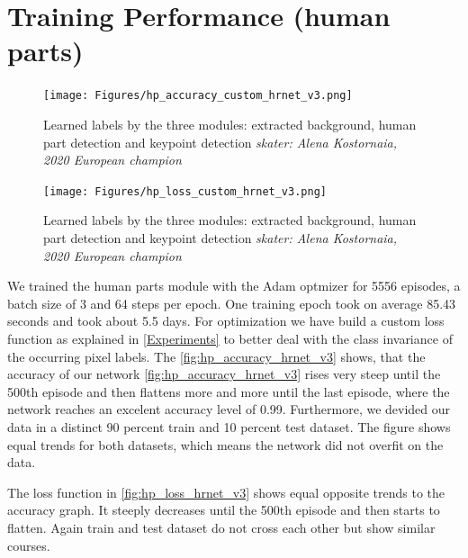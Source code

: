 \section{Training Performance (human parts)}
\begin{figure}
    \centering
    \texttt{[image: Figures/hp\_accuracy\_custom\_hrnet\_v3.png]}
    \decoRule
    \caption[Alena step]{Learned labels by the three modules: extracted background, human part detection and
    keypoint detection \textit{skater: Alena Kostornaia, 2020 European champion\cite{2020european}}}
    \label{fig:hp_accuracy_hrnet_v3}
\end{figure}
\begin{figure}
    \centering
    \texttt{[image: Figures/hp\_loss\_custom\_hrnet\_v3.png]}
    \decoRule
    \caption[Alena step]{Learned labels by the three modules: extracted background, human part detection and
    keypoint detection \textit{skater: Alena Kostornaia, 2020 European champion\cite{2020european}}}
    \label{fig:hp_loss_hrnet_v3}
\end{figure}

We trained the human parts module with the Adam optmizer for 5556 episodes, a batch size of 3 and 64 steps per epoch.
One training epoch took on average 85.43 seconds and took about 5.5 days.
For optimization we have build a custom loss function as explained in
\autoref{Experiments} to better deal with the class invariance of the occurring pixel labels.
The \autoref{fig:hp_accuracy_hrnet_v3} shows, that the accuracy of our network
\autoref{fig:hp_accuracy_hrnet_v3} rises very steep until the 500th episode and then flattens more and more until the last
episode, where the network reaches an excelent accuracy level of 0.99.
Furthermore, we devided our data in a distinct 90 percent train and 10 percent test dataset.
The figure shows equal trends for both datasets, which means the network did not overfit on the data.\

The loss function in \autoref{fig:hp_loss_hrnet_v3} shows equal opposite trends to the accuracy graph.
It steeply decreases until the 500th episode and then starts to flatten.
Again train and test dataset do not cross each other but show similar courses.

